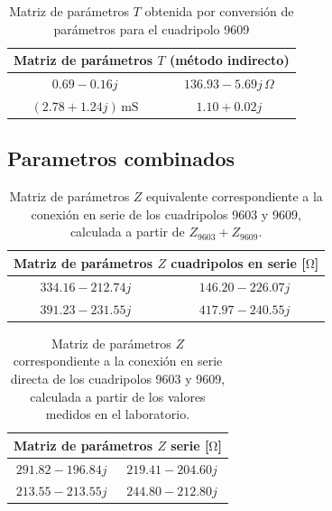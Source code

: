 \begin{table}[H]
\centering
\begin{tabular}{|c|c|}
\hline
\multicolumn{2}{|c|}{\textbf{Matriz de parámetros $T$ (método indirecto)}} \\ \hline
$0.69 - 0.16j$ & $136.93 - 5.69j\,\Omega$ \\ \hline
$(2.78 + 1.24j)\,\mathrm{mS}$ & $1.10 + 0.02j$ \\ \hline
\end{tabular}
\caption{Matriz de parámetros $T$ obtenida por conversión de parámetros para el cuadripolo 9609}
\label{tab:matriz_T9609_indirecta}
\end{table}

	\subsection*{Parametros combinados}
	
\begin{table}[H]
\centering
\begin{tabular}{|c|c|}
\hline
\multicolumn{2}{|c|}{\textbf{Matriz de parámetros $Z$ cuadripolos en serie [$\mathrm{\Omega}$]}} \\ \hline
$334.16 - 212.74j\,$ & $146.20 - 226.07j\,$ \\ \hline
$391.23 - 231.55j\,$ & $417.97 - 240.55j\,$ \\ \hline
\end{tabular}
\caption{Matriz de parámetros $Z$ equivalente correspondiente a la conexión en serie de los cuadripolos 9603 y 9609, calculada a partir de $Z_{9603} + Z_{9609}$.}
\label{tab:matriz_Z_serie_9603_9609}
\end{table}

\begin{table}[H]
\centering
\begin{tabular}{|c|c|}
\hline
\multicolumn{2}{|c|}{\textbf{Matriz de parámetros $Z$ serie [$\mathrm{\Omega}$]}} \\ \hline
$291.82 - 196.84j\,$ & $219.41 - 204.60j\,$ \\ \hline
$213.55 - 213.55j\,$ & $244.80 - 212.80j\,$ \\ \hline
\end{tabular}
\caption{Matriz de parámetros $Z$ correspondiente a la conexión en serie directa de los cuadripolos 9603 y 9609, calculada a partir de los valores medidos en el laboratorio.}
\label{tab:matriz_Z_serie_directa}
\end{table}

